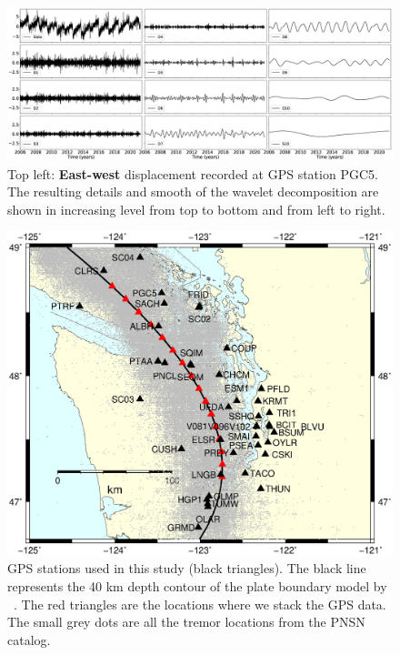 \documentclass{article}
\begin{document}
\begin{figure}
\noindent\includegraphics[width=\textwidth, trim={0cm 0cm 0cm 0cm},clip]{figures/cleaned_PGC5_lon.eps}
\caption{Top left: \textbf{East-west} displacement recorded at GPS station PGC5. The resulting details and smooth of the wavelet decomposition are shown in increasing level from top to bottom and from left to right.}
\label{pngfiguresample}
\end{figure}

\begin{figure}
\noindent\includegraphics[width=\textwidth, trim={0cm 0cm 0cm 0cm},clip]{figures/map_GPS_stations.eps}
\caption{GPS stations used in this study (black triangles). The black line represents the 40 km depth contour of the plate boundary model by ~\citet{PRE_2003}. The red triangles are the locations where we stack the GPS data. The small grey dots are all the tremor locations from the PNSN catalog.}
\label{pngfiguresample}
\end{figure}
\end{document}
